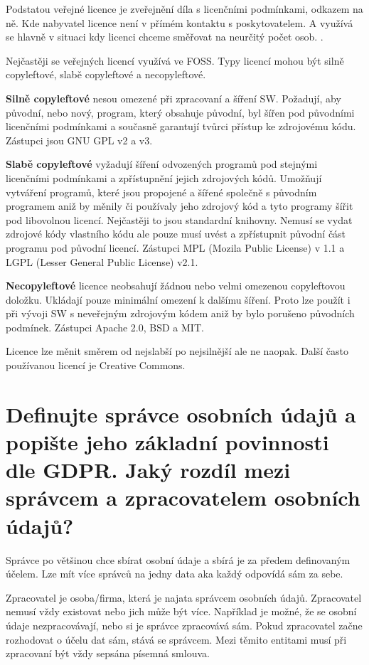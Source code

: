 Podstatou veřejné licence je zveřejnění díla s licenčními podmínkami, odkazem na ně. Kde nabyvatel licence není v přímém kontaktu s poskytovatelem. A využívá se hlavně v situaci kdy licenci chceme směřovat na neurčitý počet osob. .

Nejčastěji se veřejných licencí využívá ve FOSS\@. Typy licencí mohou být silně copyleftové, slabě copyleftové a necopyleftové.

\textbf{Silně copyleftové} nesou omezené při zpracovaní a šíření SW\@. Požadují, aby původní, nebo nový, program, který obsahuje původní, byl šířen pod původními licenčními podmínkami a současně garantují tvůrci přístup ke zdrojovému kódu. Zástupci jsou GNU GPL v2 a v3.

\textbf{Slabě copyleftové} vyžadují šíření odvozených programů pod stejnými licenčními podmínkami a zpřístupnění jejich zdrojových kódů. Umožňují vytváření programů, které jsou propojené a šířené společně s původním programem aniž by měnily či používaly jeho zdrojový kód a tyto programy šířit pod libovolnou licencí. Nejčastěji to jsou standardní knihovny. Nemusí se vydat zdrojové kódy vlastního kódu ale pouze musí uvést a zpřístupnit původní část programu pod původní licencí. Zástupci MPL (Mozila Public License) v 1.1 a  LGPL (Lesser General Public License) v2.1.

\textbf{Necopyleftové} licence neobsahují žádnou nebo velmi omezenou copyleftovou doložku. Ukládají pouze minimální omezení k dalšímu šíření. Proto lze použít i při vývoji SW s neveřejným zdrojovým kódem aniž by bylo porušeno původních podmínek. Zástupci Apache 2.0, BSD a MIT\@.

Licence lze měnit směrem od nejslabší po nejsilnější ale ne naopak. Další často používanou licencí je Creative Commons.


\section{Definujte správce osobních údajů a popište jeho základní povinnosti dle GDPR\@. Jaký rozdíl mezi správcem a zpracovatelem osobních údajů?}

Správce po většinou chce sbírat osobní údaje a sbírá je za předem definovaným účelem. Lze mít více správců na jedny data aka každý odpovídá sám za sebe.

Zpracovatel je osoba/firma, která je najata správcem osobních údajů. Zpracovatel nemusí vždy existovat nebo jich může být více. Například je možné, že se osobní údaje nezpracovávají, nebo si je správce zpracovává sám. Pokud zpracovatel začne rozhodovat o účelu dat sám, stává se správcem. Mezi těmito entitami musí při zpracovaní být vždy sepsána písemná smlouva.

